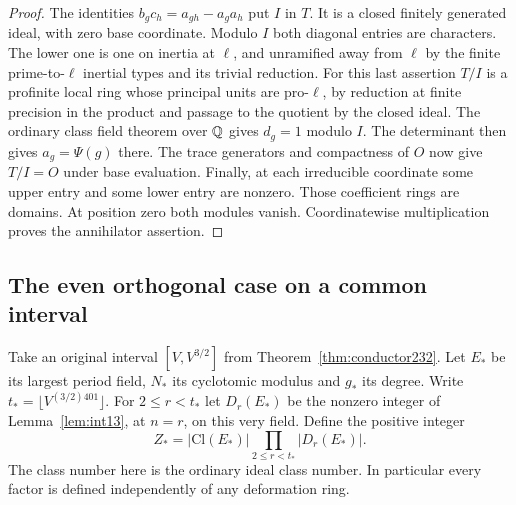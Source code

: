 \documentclass[a4paper,11pt]{article}
\theoremstyle{definition}
\theoremstyle{remark}
\numberwithin{equation}{section}
\begin{document}
\begin{proof}
The identities \(b_g c_h=a_{gh}-a_g a_h\) put \(I\) in \(T\).
It is a closed finitely generated ideal, with zero base
coordinate. Modulo \(I\) both diagonal entries are characters.
The lower one is one on inertia at \(\ell\), and unramified
away from \(\ell\) by the finite prime-to-\(\ell\) inertial
types and its trivial reduction. For this last assertion
\(T/I\) is a profinite local ring whose principal units are
pro-\(\ell\), by reduction at finite precision in the product
and passage to the quotient by the closed ideal. The ordinary
class field theorem over \(\mathbb Q\) gives \(d_g=1\) modulo \(I\).
The determinant then gives \(a_g=\Psi(g)\) there. The trace
generators and compactness of \(O\) now give \(T/I=O\) under
base evaluation. Finally, at each irreducible coordinate some
upper entry and some lower entry are nonzero. Those coefficient
rings are domains. At position zero both modules vanish.
Coordinatewise multiplication proves the annihilator assertion.
\end{proof}

\subsection{The even orthogonal case on a common interval}\label{nav:I-74}
Take an original interval \([V,V^{3/2}]\) from
Theorem~\ref{thm:conductor232}. Let \(E_*\) be its largest
period field, \(N_*\) its cyclotomic modulus and \(g_*\) its
degree. Write \(t_*=\lfloor V^{(3/2)401}\rfloor\).
For \(2\le r<t_*\) let \(D_r(E_*)\) be the nonzero integer
of Lemma~\ref{lem:int13}, at \(n=r\), on this very field.
Define the positive integer
\[
            Z_*=|\mathrm{Cl}(E_*)|
                   \prod_{2\le r<t_*}|D_r(E_*)|.
\]
The class number here is the ordinary ideal class number. In
particular every factor is defined independently of any
deformation ring.
\end{document}
